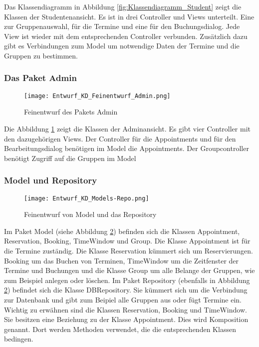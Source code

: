 \documentclass[a4paper,10pt]{article}
\begin{document}
Das Klassendiagramm in Abbildung \ref{fig:Klassendiagramm_Student} zeigt die Klassen der Studentenansicht. Es ist in drei Controller und Views unterteilt. Eine zur Gruppenauswahl, für die Termine und eine für den Buchungsdialog.
 Jede View ist wieder mit dem entsprechenden Controller verbunden. Zusätzlich dazu gibt es Verbindungen zum Model um notwendige Daten der Termine und die Gruppen zu bestimmen.
 
 \subsubsection{Das Paket Admin}
 \begin{figure}
  \texttt{[image: Entwurf\_KD\_Feinentwurf\_Admin.png]}
  \label{fig:Klassendiagramm_Admin}
  \caption{Feinentwurf des Pakets Admin}
 \end{figure} 

 Die Abbildung \ref{fig:Klassendiagramm_Admin} zeigt die Klassen der Adminansicht. Es gibt vier Controller mit den dazugehörigen Views. Der Controller für die Appointments und für den Bearbeitungsdialog benötigen im Model die Appointments. Der Groupcontroller benötigt Zugriff auf die Gruppen im Model
 
 \subsubsection{Model und Repository}
 
 \begin{figure}
  \texttt{[image: Entwurf\_KD\_Models-Repo.png]}
  \label{fig:Klassendiagramm_Models-Repo}
\caption{Feinentwurf von Model und das Repository}
 \end{figure} 

Im Paket Model (siehe Abbildung \ref{fig:Klassendiagramm_Models-Repo}) befinden sich die Klassen Appointment, Reservation, Booking, TimeWindow und Group. Die Klasse Appointment ist für die Termine zuständig. Die Klasse Reservation kümmert sich um Reservierungen. Booking um das Buchen von Terminen, TimeWindow um die Zeitfenster der Termine und Buchungen und die Klasse Group um alle Belange der Gruppen, wie zum Beispiel anlegen oder löschen.
Im Paket Repository (ebenfalls in Abbildung \ref{fig:Klassendiagramm_Models-Repo}) befindet sich die Klasse DBRepository. Sie kümmert sich um die Verbindung zur Datenbank und gibt zum Beipiel alle Gruppen aus oder fügt Termine ein.
Wichtig zu erw\"ahnen sind die Klassen Reservation, Booking und TimeWindow. Sie besitzen eine Beziehung zu der Klasse Appointment. Dies wird Komposition genannt. Dort werden Methoden verwendet, die die entsprechenden Klassen bedingen.
\end{document}
